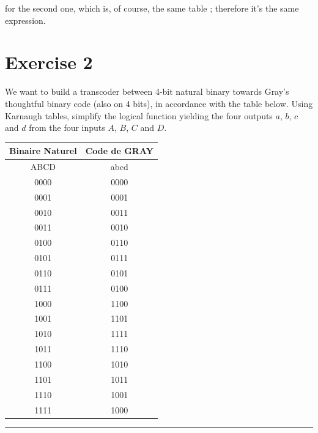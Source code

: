 \documentclass[a4paper,10pt]{article}
\def\centralruler{\begin{center}\rule{5cm}{.1pt}\end{center}}
\begin{document}
for the second one, which is, of course, the same table ; therefore it's the same expression.

\section{Exercise 2}

We want to build a transcoder between 4-bit natural binary towards Gray's thoughtful binary code (also on 4 bits), in accordance with the table below. Using Karnaugh tables, simplify the logical function yielding the four outputs $a$, $b$, $c$ and $d$ from the four inputs $A$, $B$, $C$ and $D$.
\begin{center}
	\begin{tabular}{|c|c|}
		\hline
		Binaire Naturel&Code de GRAY\\\hline
		ABCD&abcd\\\hline
		0000&0000\\\hline
		0001&0001\\\hline
		0010&0011\\\hline
		0011&0010\\\hline
		0100&0110\\\hline
		0101&0111\\\hline
		0110&0101\\\hline
		0111&0100\\\hline
		1000&1100\\\hline
		1001&1101\\\hline
		1010&1111\\\hline
		1011&1110\\\hline
		1100&1010\\\hline
		1101&1011\\\hline
		1110&1001\\\hline
		1111&1000\\\hline
	\end{tabular}
\end{center}
\centralruler
\end{document}
